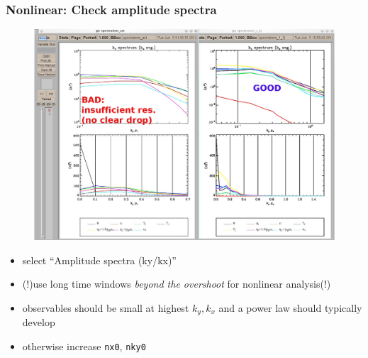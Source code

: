 \documentclass[10pt]{beamer}
\begin{document}
\begin{frame}
  \frametitle{Nonlinear: Check amplitude spectra}

\begin{figure}
\includegraphics[height=0.6\textheight]{figs/spectra.jpg}
\end{figure}

\begin{block}{}
\begin{itemize}
 \item select ``Amplitude spectra (ky/kx)''
 \item (!)use long time windows {\em beyond the overshoot} for nonlinear analysis(!)
 \item observables should be small at highest $k_y, k_x$ and a power law should typically 
develop
\item otherwise increase {\tt nx0}, {\tt nky0} 
\end{itemize}

\end{block}


\end{frame}

\end{document}
